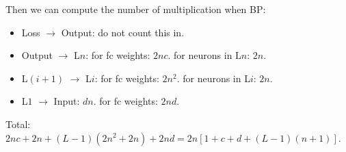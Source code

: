 Then we can compute the number of multiplication when BP:

\begin{itemize}
    \item Loss $\to$ Output: do not count this in.
    \item Output $\to$ L$n$:
        for fc weights: $2nc$.
        for neurons in L$n$: $2n$.
    \item L$(i+1)$ $\to$ L$i$:
        for fc weights: $2n^2$.
        for neurons in L$i$: $2n$.
    \item L$1$ $\to$ Input: $dn$.
        for fc weights: $2nd$.
\end{itemize}

Total: $2nc+2n+(L-1)(2n^2+2n)+2nd=2n[1+c+d+(L-1)(n+1)]$.

\subsection{} %
